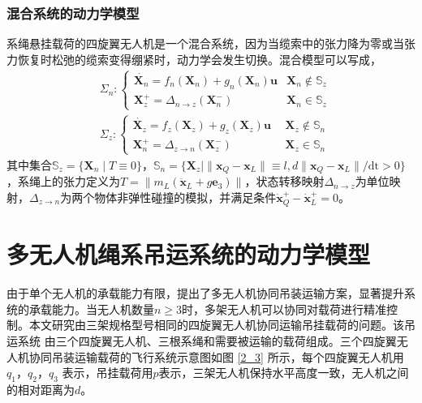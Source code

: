 \documentclass[lang=chs, degree=master, blindreview=true, winfonts=true]{yanputhesis}
\begin{document}
\subsubsection{混合系统的动力学模型}
系绳悬挂载荷的四旋翼无人机是一个混合系统，因为当缆索中的张力降为零或当张力恢复时松弛的缆索变得绷紧时，动力学会发生切换。混合模型可以写成，
\begin{equation}
	\left.\begin{aligned}&\Sigma_{n}:\left\{\begin{array}{ll}\dot{\bm X_n}= f_n(\bm X_n)+ g_n(\bm X_n)\bm u  &\bm X_n\notin \mathbb{S}_z\\\bm X_z^+=\Delta_{n\to z}(\bm X_n^-)  &\bm X_n\in \mathbb{S}_z\end{array}\right.\\&\Sigma_{z}:\left\{\begin{array}{ll}\dot{\bm X_z}=f_z(\bm X_z) + g_z(\bm X_z)\bm u \ \ &\bm X_z\notin \mathbb{S}_n\\\bm X_n^+=\Delta_{z\to n}(\bm X_z^-) \ &\bm X_z\in \mathbb{S}_n\end{array}\right.\end{aligned}\right.
	\label{eq:混合模型}
\end{equation}
其中集合$\mathbb S_z = \{ \bm X_n \mid  T \equiv 0 \}$，$\mathbb S_n = \{ \bm X_z \mid \|\bm x_Q - \bm x_L\| \equiv l, d \|\bm x_Q - \bm x_L\| /\text{dt}> 0 \}$，系绳上的张力定义为$ T = \|m_L (\ddot{\bm x}_L + g\bm{e}_3)\|$，状态转移映射$\Delta_{n\to z}$为单位映射，$\Delta_{z\to n}$为两个物体非弹性碰撞的模拟，并满足条件$\dot{\bm x}_Q^+-\dot{\bm x}_L^+=0$。

\section{多无人机绳系吊运系统的动力学模型}
由于单个无人机的承载能力有限，提出了多无人机协同吊装运输方案，显著提升系统的承载能力。当无人机数量$n\geq3$时，多架无人机可以协同对载荷进行精准控制\cite{fink2011planning}。本文研究由三架规格型号相同的四旋翼无人机协同运输吊挂载荷的问题。该吊运系统
由三个四旋翼无人机、三根系绳和需要被运输的载荷组成。三个四旋翼无人机协同吊装运输载荷的飞行系统示意图如图 \ref{2_3} 所示，每个四旋翼无人机用
$q_1$，$q_2$，$q_3$ 表示，吊挂载荷用$p$表示，三架无人机保持水平高度一致，无人机之间的相对距离为$d$。
\end{document}
